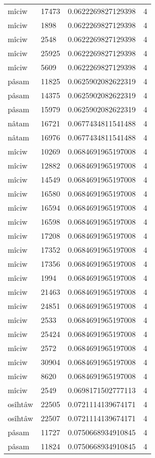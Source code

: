 \begin{longtable}{llll}
mîciw & 17473 & 0.0622269827129398 & 4 \\
mîciw & 1898 & 0.0622269827129398 & 4 \\
mîciw & 2548 & 0.0622269827129398 & 4 \\
mîciw & 25925 & 0.0622269827129398 & 4 \\
mîciw & 5609 & 0.0622269827129398 & 4 \\
pâsam & 11825 & 0.0625902082622319 & 4 \\
pâsam & 14375 & 0.0625902082622319 & 4 \\
pâsam & 15979 & 0.0625902082622319 & 4 \\
nâtam & 16721 & 0.0677434811541488 & 4 \\
nâtam & 16976 & 0.0677434811541488 & 4 \\
mîciw & 10269 & 0.0684691965197008 & 4 \\
mîciw & 12882 & 0.0684691965197008 & 4 \\
mîciw & 14549 & 0.0684691965197008 & 4 \\
mîciw & 16580 & 0.0684691965197008 & 4 \\
mîciw & 16594 & 0.0684691965197008 & 4 \\
mîciw & 16598 & 0.0684691965197008 & 4 \\
mîciw & 17208 & 0.0684691965197008 & 4 \\
mîciw & 17352 & 0.0684691965197008 & 4 \\
mîciw & 17356 & 0.0684691965197008 & 4 \\
mîciw & 1994 & 0.0684691965197008 & 4 \\
mîciw & 21463 & 0.0684691965197008 & 4 \\
mîciw & 24851 & 0.0684691965197008 & 4 \\
mîciw & 2533 & 0.0684691965197008 & 4 \\
mîciw & 25424 & 0.0684691965197008 & 4 \\
mîciw & 2572 & 0.0684691965197008 & 4 \\
mîciw & 30904 & 0.0684691965197008 & 4 \\
mîciw & 8620 & 0.0684691965197008 & 4 \\
mîciw & 2549 & 0.0698171502777113 & 4 \\
osîhtâw & 22505 & 0.0721114139674171 & 4 \\
osîhtâw & 22507 & 0.0721114139674171 & 4 \\
pâsam & 11727 & 0.0750668934910845 & 4 \\
pâsam & 11824 & 0.0750668934910845 & 4 \\

\end{longtable}
